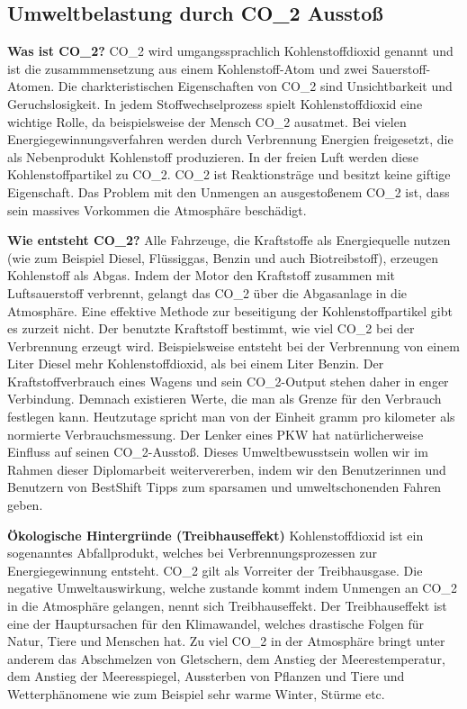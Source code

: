 \subsection{Umweltbelastung durch CO_{2} Ausstoß}

\textbf{Was ist CO_{2}?}
CO_{2} wird umgangssprachlich Kohlenstoffdioxid genannt und ist die zusammmensetzung aus einem Kohlenstoff-Atom und zwei Sauerstoff-Atomen. 
Die charkteristischen Eigenschaften von CO_{2} sind Unsichtbarkeit und Geruchslosigkeit. 
In jedem Stoffwechselprozess spielt Kohlenstoffdioxid eine wichtige Rolle, da beispielsweise der Mensch CO_{2} ausatmet. 
Bei vielen Energiegewinnungsverfahren werden durch Verbrennung Energien freigesetzt, die als Nebenprodukt Kohlenstoff produzieren. 
In der freien Luft werden diese Kohlenstoffpartikel zu CO_{2}. 
CO_{2} ist Reaktionsträge und besitzt keine giftige Eigenschaft. 
Das Problem mit den Unmengen an ausgestoßenem CO_{2} ist, dass sein massives Vorkommen die Atmosphäre beschädigt.

\textbf{Wie entsteht CO_{2}?}
Alle Fahrzeuge, die Kraftstoffe als Energiequelle nutzen 
(wie zum Beispiel Diesel, Flüssiggas, Benzin und auch Biotreibstoff), erzeugen Kohlenstoff als Abgas. 
Indem der Motor den Kraftstoff zusammen mit Luftsauerstoff verbrennt, gelangt das CO_{2} über die Abgasanlage in die Atmosphäre. 
Eine effektive Methode zur beseitigung der Kohlenstoffpartikel gibt es zurzeit nicht. 
Der benutzte Kraftstoff bestimmt, wie viel CO_{2} bei der Verbrennung erzeugt wird. 
Beispielsweise entsteht bei der Verbrennung von einem Liter Diesel mehr Kohlenstoffdioxid, als bei einem Liter Benzin.
Der Kraftstoffverbrauch eines Wagens und sein CO_{2}-Output stehen daher in enger Verbindung. 
Demnach existieren Werte, die man als Grenze für den Verbrauch festlegen kann. 
Heutzutage spricht man von der Einheit gramm pro kilometer als normierte Verbrauchsmessung.
Der Lenker eines PKW hat natürlicherweise Einfluss auf seinen CO_{2}-Ausstoß. 
Dieses Umweltbewusstsein wollen wir im Rahmen dieser Diplomarbeit weitervererben, indem wir den Benutzerinnen und Benutzern 
von BestShift Tipps zum sparsamen und umweltschonenden Fahren geben.

\textbf{Ökologische Hintergründe (Treibhauseffekt)}
Kohlenstoffdioxid ist ein sogenanntes Abfallprodukt, welches bei Verbrennungsprozessen zur Energiegewinnung entsteht. 
CO_{2} gilt als Vorreiter der Treibhausgase.
Die negative Umweltauswirkung, welche zustande kommt indem Unmengen an CO_{2} in die Atmosphäre gelangen, 
nennt sich Treibhauseffekt. 
Der Treibhauseffekt ist eine der Hauptursachen für den Klimawandel, welches drastische Folgen für Natur, Tiere und Menschen hat. 
Zu viel CO_{2} in der Atmosphäre bringt unter anderem das Abschmelzen von Gletschern, 
dem Anstieg der Meerestemperatur, dem Anstieg der Meeresspiegel, 
Aussterben von Pflanzen und Tiere und Wetterphänomene wie zum Beispiel sehr warme Winter, Stürme etc.

